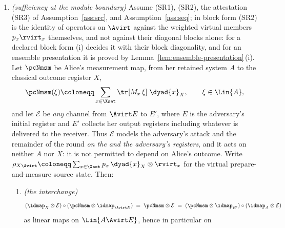 \begin{theorem}
\begin{enumerate}[label=(\roman*),leftmargin=2.2em]
signal-side marginal and the virtual average signal state agree,
\begin{equation}\label{eq:srconsist}
  \sum_xp_x\rvirt_x=\tr_A\Psi ,
\end{equation}
\emph{if} $\Pi_U\big(\sum_xM_x\big)\Pi_U=\Pi_U$, in either form; in
particular they agree for the certificate of a source specification, whose
$\{M_x\}$ is a POVM by Definition~\ref{def:source-spec}. The converse,
\emph{only if}, holds in pure form, and in block form whenever every non-zero
block $\Psi_t$ is a positive multiple of a rank-one projector; it fails for a
general positive block.
\item \emph{(sufficiency at the module boundary)} Assume (SR1), (SR2), the
attestation (SR3) of Assumption~\ref{ass:src}, and
Assumption~\ref{ass:seq}; in block form (SR2) is the identity of operators on
$\Avirt$ against the weighted virtual members $p_x\rvirt_x$ themselves, and
not against their diagonal blocks alone: for a declared block form (i) decides
it with their block diagonality, and for an ensemble presentation it is
proved by Lemma~\ref{lem:ensemble-presentation}\,(i). Let $\pcNmsm$ be Alice's measurement map, from
her retained system $A$ to the classical outcome register $X$,
\begin{equation}\label{eq:Nmsm}
  \pcNmsm(\xi)\coloneqq\sum_{x\in\Xset}\tr[M_x\,\xi]\;\dyad{x}_{X},
  \qquad \xi\in\Lin{A} ,
\end{equation}
and let $\mathcal{E}$ be \emph{any} channel from $\Avirt E$ to $E'$, where
$E$ is the adversary's initial register and $E'$ collects her output
registers including whatever is delivered to the receiver. Thus
$\mathcal{E}$ models the adversary's attack and the remainder of the round
\emph{on the  and the adversary's registers}, and it
acts on neither $A$ nor $X$: it is not permitted to depend on Alice's
outcome. Write
$\rho_{X\Avirt}\coloneqq\sum_{x\in\Xset}p_x\,\dyad{x}_X\otimes\rvirt_x$ for
the virtual prepare-and-measure source state. Then:
\begin{enumerate}[label=(\alph*),leftmargin=2.2em]
\item \emph{(the interchange)}
\begin{equation}\label{eq:srmain}
  (\idmap_{X}\otimes\mathcal{E})\circ(\pcNmsm\otimes\idmap_{\Avirt E})
  \;=\;\pcNmsm\otimes\mathcal{E}\;=\;
  (\pcNmsm\otimes\idmap_{E'})\circ(\idmap_{A}\otimes\mathcal{E})
\end{equation}
as linear maps on $\Lin{A\Avirt E}$, hence in particular on

\end{enumerate}
\end{enumerate}
\end{theorem}
